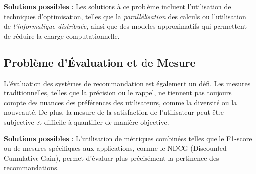 \textbf{Solutions possibles :} Les solutions à ce problème incluent l’utilisation de techniques d'optimisation, telles que la \textit{parallélisation} des calculs ou l'utilisation de \textit{l'informatique distribuée}, ainsi que des modèles approximatifs qui permettent de réduire la charge computationnelle.

\subsection{Problème d'Évaluation et de Mesure}

L’évaluation des systèmes de recommandation est également un défi. Les mesures traditionnelles, telles que la précision ou le rappel, ne tiennent pas toujours compte des nuances des préférences des utilisateurs, comme la diversité ou la nouveauté. De plus, la mesure de la satisfaction de l’utilisateur peut être subjective et difficile à quantifier de manière objective.

\textbf{Solutions possibles :} L’utilisation de métriques combinées telles que le F1-score ou de mesures spécifiques aux applications, comme le NDCG (Discounted Cumulative Gain), permet d’évaluer plus précisément la pertinence des recommandations.
